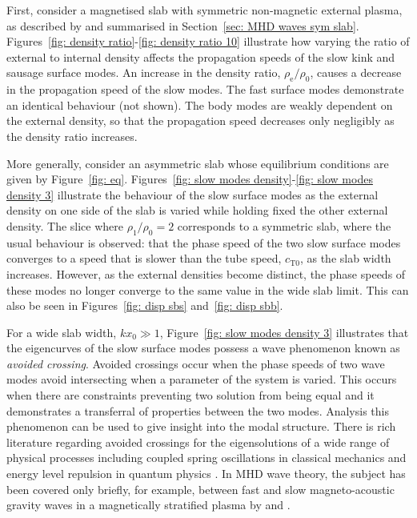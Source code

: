 \documentclass[12pt]{../style-files/ociamthesis}
\begin{document}
First, consider a magnetised slab with symmetric non-magnetic external plasma, as described by \cite{rob81b} and summarised in Section~\ref{sec: MHD waves sym slab}. Figures~\ref{fig: density ratio}-\ref{fig: density ratio 10} illustrate how varying the ratio of external to internal density affects the propagation speeds of the slow kink and sausage surface modes. An increase in the density ratio, $\rho_\textrm{e}/\rho_0$, causes a decrease in the propagation speed of the slow modes. The fast surface modes demonstrate an identical behaviour (not shown). The body modes are weakly dependent on the external density, so that the propagation speed decreases only negligibly as the density ratio increases.

More generally, consider an asymmetric slab whose equilibrium conditions are given by Figure~\ref{fig: eq}. Figures~\ref{fig: slow modes density}-\ref{fig: slow modes density 3} illustrate the behaviour of the slow surface modes as the external density on one side of the slab is varied while holding fixed the other external density. The slice where $\rho_1/\rho_0 = 2$ corresponds to a symmetric slab, where the usual behaviour is observed: that the phase speed of the two slow surface modes converges to a speed that is slower than the tube speed, $c_\textrm{T0}$, as the slab width increases. However, as the external densities become distinct, the phase speeds of these modes no longer converge to the same value in the wide slab limit. This can also be seen in Figures~\ref{fig: disp sbs} and~\ref{fig: disp sbb}.

For a wide slab width, $kx_0 \gg 1$, Figure~\ref{fig: slow modes density 3} illustrates that the eigencurves of the slow surface modes possess a wave phenomenon known as \textit{avoided crossing}. Avoided crossings occur when the phase speeds of two wave modes avoid intersecting when a parameter of the system is varied. This occurs when there are constraints preventing two solution from being equal and it demonstrates a transferral of properties between the two modes. Analysis this phenomenon can be used to give insight into the modal structure. There is rich literature regarding avoided crossings for the eigensolutions of a wide range of physical processes including coupled spring oscillations in classical mechanics \citep{nov10} and energy level repulsion in quantum physics \citep{naq_etal72}. In MHD wave theory, the subject has been covered only briefly, for example, between fast and slow magneto-acoustic gravity waves in a magnetically stratified plasma by \cite{abd90} and \cite{mat_etal2016}.
\end{document}
